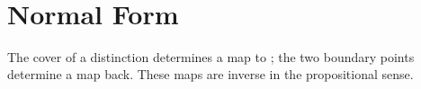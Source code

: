 \documentclass[11pt]{article}
\begin{document}
\begin{code}
\\
\>[0]\AgdaSpace{}%
\AgdaSymbol{:}\AgdaSpace{}%
\<%
\\
\>[0]\AgdaSpace{}%
\AgdaSymbol{=}\AgdaSpace{}%
\<%
\\
\>[0][@{}l@{\AgdaIndent{0}}]%
\>[2]\AgdaSymbol{\{}\AgdaSpace{}%
%
\>[14]\AgdaSymbol{=}\AgdaSpace{}%
\<%
\\
%
\>[2]\AgdaSymbol{;}\AgdaSpace{}%
%
\>[14]\AgdaSymbol{=}\AgdaSpace{}%
\<%
\\
%
\>[2]\AgdaSymbol{;}\AgdaSpace{}%
%
\>[14]\AgdaSymbol{=}\AgdaSpace{}%
\<%
\\
%
\>[2]\AgdaSymbol{;}\AgdaSpace{}%
\AgdaSpace{}%
\AgdaSymbol{=}\AgdaSpace{}%
\<%
\\
%
\>[2]\AgdaSymbol{;}\AgdaSpace{}%
%
\>[14]\AgdaSymbol{=}\AgdaSpace{}%
\<%
\\
%
\>[2]\AgdaSymbol{\}}\<%
\end{code}

\section{Normal Form}

The cover of a distinction determines a map to ; the
two boundary points determine a map back.  These maps are inverse in the
propositional sense.
\end{document}
